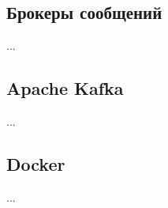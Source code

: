 \subsection{Брокеры сообщений}
...

\subsection{Apache Kafka}
...

\subsection{Docker}
...



%
%
%
%



